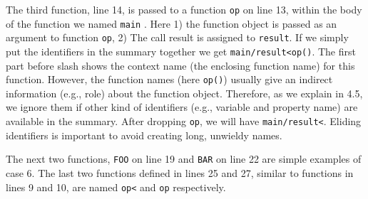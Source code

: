 \documentclass[10pt, preprint]{sigplanconf}
\begin{document}
The third function, line 14, is passed to a function {\small\texttt{op}} on line 13, within the body of the function we named {\small\texttt{main}} . Here 1) the function object is passed as an argument to function {\small\texttt{op}}, 2) The call result is assigned to {\small\texttt{result}}. If we simply put the identifiers in the summary together we get {\small\texttt{main/result<op()}}. The first part before slash  shows the context name (the enclosing function name) for this function.  However, the function names (here {\small\texttt{op()}}) usually give an indirect information (e.g., role) about the function object. Therefore, as we explain in 4.5, we ignore them if other kind of identifiers (e.g., variable and property name) are available in the summary. After dropping {\small\texttt{op}}, we will have {\small\texttt{main/result<}}. Eliding identifiers is important to avoid creating long, unwieldy names.

The next two functions, {\small\texttt{FOO}} on line 19 and {\small\texttt{BAR}} on line 22 are simple examples of case 6.  The last two functions defined in lines 25 and 27, similar to functions in lines 9 and 10, are named {\small\texttt{op<}} and {\small\texttt{op}} respectively. 
\end{document}
